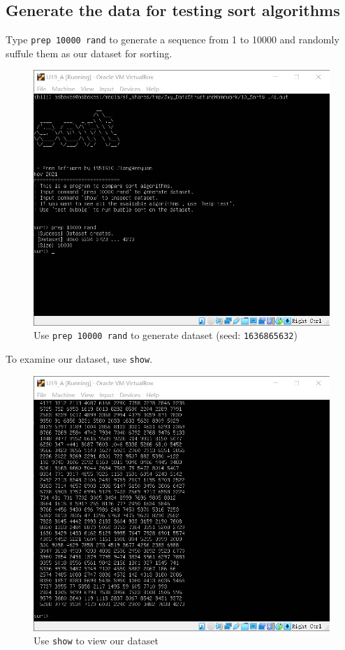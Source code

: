 \documentclass[cn,black,12pt,normal]{elegantnote}
\begin{document}
\subsection{Generate the data for testing sort algorithms}

Type \lstinline{prep 10000 rand} to generate a sequence from 1 to 10000 and randomly suffule them as our dataset for sorting.

\begin{figure}[H]
    \centering
    \includegraphics[width=0.7\linewidth]{image/sort_02.jpg}
    \caption{Use \lstinline{prep 10000 rand} to generate dataset (seed: \lstinline{1636865632})}
\end{figure}

To examine our dataset, use \lstinline{show}.

\begin{figure}[H]
    \centering
    \includegraphics[width=0.7\linewidth]{image/sort_03.jpg}
    \caption{Use \lstinline{show} to view our dataset}
\end{figure}
\end{document}
